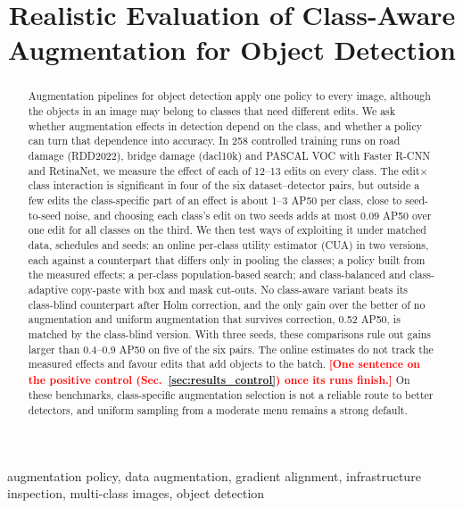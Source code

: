 \documentclass[conference]{IEEEtran}
\newcommand{\todo}[1]{\textcolor{red}{\textbf{[#1]}}}
\begin{document}
\title{Realistic Evaluation of Class-Aware Augmentation for Object Detection}
\maketitle

\begin{abstract}
Augmentation pipelines for object detection apply one policy to every image, although the objects in an image may belong to classes that need different edits. We ask whether augmentation effects in detection depend on the class, and whether a policy can turn that dependence into accuracy. In 258 controlled training runs on road damage (RDD2022), bridge damage (dacl10k) and PASCAL VOC with Faster R-CNN and RetinaNet, we measure the effect of each of 12--13 edits on every class. The edit$\times$class interaction is significant in four of the six dataset--detector pairs, but outside a few edits the class-specific part of an effect is about 1--3 AP50 per class, close to seed-to-seed noise, and choosing each class's edit on two seeds adds at most 0.09 AP50 over one edit for all classes on the third. We then test ways of exploiting it under matched data, schedules and seeds: an online per-class utility estimator (CUA) in two versions, each against a counterpart that differs only in pooling the classes; a policy built from the measured effects; a per-class population-based search; and class-balanced and class-adaptive copy-paste with box and mask cut-outs. No class-aware variant beats its class-blind counterpart after Holm correction, and the only gain over the better of no augmentation and uniform augmentation that survives correction, 0.52 AP50, is matched by the class-blind version. With three seeds, these comparisons rule out gains larger than 0.4--0.9 AP50 on five of the six pairs. The online estimates do not track the measured effects and favour edits that add objects to the batch. \todo{One sentence on the positive control (Sec.~\ref{sec:results_control}) once its runs finish.} On these benchmarks, class-specific augmentation selection is not a reliable route to better detectors, and uniform sampling from a moderate menu remains a strong default.
\end{abstract}

\begin{IEEEkeywords}
augmentation policy, data augmentation, gradient alignment, infrastructure inspection, multi-class images, object detection
\end{IEEEkeywords}
\end{document}
